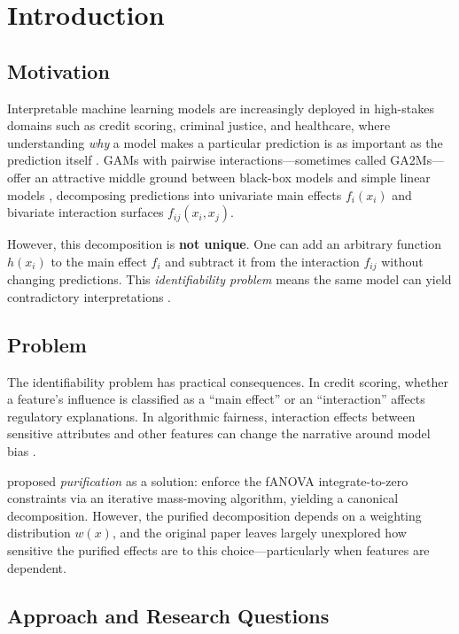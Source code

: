 \chapter{Introduction}\label{chap:introduction}

\section{Motivation}

Interpretable machine learning models are increasingly deployed in high-stakes domains such as credit scoring, criminal justice, and healthcare, where understanding \emph{why} a model makes a particular prediction is as important as the prediction itself \citep{molnar2022interpretable}.
\Glspl{GAM} with pairwise interactions---sometimes called \glspl{GA2M}---offer an attractive middle ground between black-box models and simple linear models \citep{lou2013accurate}, decomposing predictions into univariate main effects $f_i(x_i)$ and bivariate interaction surfaces $f_{ij}(x_i, x_j)$.

However, this decomposition is \textbf{not unique}.
One can add an arbitrary function $h(x_i)$ to the main effect $f_i$ and subtract it from the interaction $f_{ij}$ without changing predictions.
This \emph{identifiability problem} means the same model can yield contradictory interpretations \citep{lengerich2020purifying}.

\section{Problem}

The identifiability problem has practical consequences.
In credit scoring, whether a feature's influence is classified as a ``main effect'' or an ``interaction'' affects regulatory explanations.
In algorithmic fairness, interaction effects between sensitive attributes and other features can change the narrative around model bias \citep{angwin2016machine}.

\citet{lengerich2020purifying} proposed \emph{purification} as a solution: enforce the \gls{fANOVA} integrate-to-zero constraints via an iterative mass-moving algorithm, yielding a canonical decomposition.
However, the purified decomposition depends on a weighting distribution $w(x)$, and the original paper leaves largely unexplored how sensitive the purified effects are to this choice---particularly when features are dependent.

\section{Approach and Research Questions}


